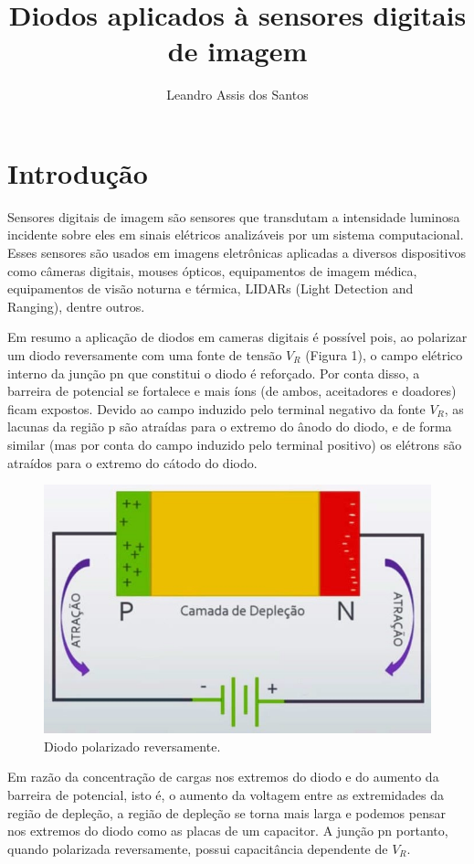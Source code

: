 \documentclass[10pt,a4paper,twocolumn]{article}
\title{\textbf{Diodos aplicados à sensores digitais de imagem}}
\author{Leandro Assis dos Santos}
\begin{document}
\maketitle

\section*{Introdução}
		Sensores digitais de imagem são sensores que transdutam a intensidade luminosa incidente sobre eles em sinais elétricos analizáveis por um sistema computacional. Esses sensores são usados em imagens eletrônicas aplicadas a diversos dispositivos como câmeras digitais, mouses ópticos, equipamentos de imagem médica, equipamentos de visão noturna e térmica, LIDARs (Light Detection and Ranging), dentre outros.
				
		Em resumo a aplicação de diodos em cameras digitais é possível pois, ao polarizar um diodo reversamente com uma fonte de tensão $V_{R}$ (Figura 1), o campo elétrico interno da junção pn que constitui o diodo é reforçado. Por conta disso, a barreira de potencial se fortalece e mais íons (de ambos, aceitadores e doadores) ficam expostos. Devido ao campo induzido pelo terminal negativo da fonte $V_{R}$, as lacunas da região p são atraídas para o extremo do ânodo do diodo, e de forma similar (mas por conta do campo induzido pelo terminal positivo) os elétrons são atraídos para o extremo do cátodo do diodo.
		
		\begin{figure}[!h]
			\centering
			\includegraphics[scale=0.2]{imagens/diodo_polarizado_reversamente.jpg}
			\caption{Diodo polarizado reversamente.}
		\end{figure}
		Em razão da concentração de cargas nos extremos do diodo e do aumento da barreira de potencial, isto é, o aumento da voltagem entre as extremidades da região de depleção, a região de depleção se torna mais larga e podemos pensar nos extremos do diodo como as placas de um capacitor. A junção pn portanto, quando polarizada reversamente, possui capacitância dependente de $V_{R}$.
		
\end{document}
